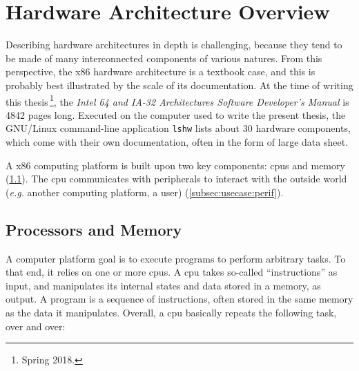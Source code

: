 \section{Hardware Architecture Overview}
\label{sec:usecase:architecture}

Describing hardware architectures in depth is challenging, because they tend to
be made of many interconnected components of various natures.
%
From this perspective, the x86 hardware architecture is a textbook case, and
this is probably best illustrated by the scale of its documentation.
%
At the time of writing this thesis\,\footnote{Spring 2018.}, the \emph{Intel 64
  and IA-32 Architectures Software Developer’s Manual} is 4842 pages long.
%
Executed on the computer used to write the present thesis, the GNU/Linux
command-line application \texttt{lshw} lists about 30 hardware components, which
come with their own documentation, often in the form of large data sheet. 

A x86 computing platform is built upon two key components: \acp{cpu} and memory
(\ref{subsec:usecase:cpumem}).
%
The \ac{cpu} communicates with peripherals to interact with the outside world
(\emph{e.g.} another computing platform, a user) (\ref{subsec:usecase:perif}). 

\subsection{Processors and Memory}
\label{subsec:usecase:cpumem}

A computer platform goal is to execute programs to perform arbitrary tasks.
%
To that end, it relies on one or more \acp{cpu}. 
%
A \ac{cpu} takes so-called ``instructions'' as input, and manipulates its
internal states and data stored in a memory, as output.
%
A program is a sequence of instructions, often stored in the same memory as the
data it manipulates. 
%
Overall, a \ac{cpu} basically repeats the following task, over and over:

